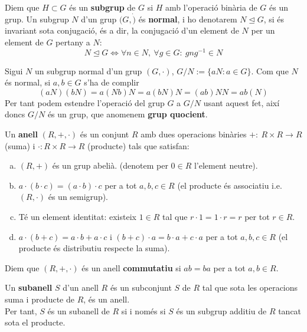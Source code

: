 \begin{definition} Diem que $H\subset G$ és un \textbf{subgrup} de $G$ si $H$ amb l'operació binària de $G$ és un grup. Un subgrup $N$ d'un grup $(G,\dot)$ és \textbf{normal}, i ho denotarem $N\trianglelefteq G$, si és invariant sota conjugació, és a dir, la conjugació d'un element de $N$ per un element de $G$ pertany a $N$:
$$
N\trianglelefteq G \Leftrightarrow \forall n\in N, \ \forall g\in G: \  gng^{-1}\in N
$$
\end{definition}

\begin{definition}\label{defGrupQuocient}
Sigui $N$ un subgrup normal d'un grup $(G,\cdot)$, $G/N:=\{aN: a\in G\}$. Com que $N$ és normal, si $a,b\in G$ s'ha de complir 
$$
(aN)(bN)=a(Nb)N=a(bN)N=(ab)NN=ab(N)
$$
Per tant podem estendre l'operació del grup $G$ a $G/N$ usant aquest fet, així doncs $G/N$ és un grup, que anomenem \textbf{grup quocient}.

\end{definition}

\begin{definition} Un \textbf{anell} $(R,+,\cdot )$ és un conjunt $R$ amb dues operacions binàries $+: \ R\times R \rightarrow R$ (suma) i $\cdot : R\times R \rightarrow R$ (producte) tals que satisfan:

\begin{enumerate}[a)]
\item $(R,+)$ és un grup abelià. (denotem per $0\in R$ l'element neutre).

\item $a\cdot (b \cdot c) = (a \cdot b) \cdot c$ per a tot $a,b,c\in R$ (el producte és associatiu i.e. $(R,\cdot )$ és un semigrup).
\item Té un element identitat: existeix $1\in R$ tal que $r\cdot 1=1\cdot r =r$ per tot $r\in R$.
\item $a \cdot (b+c)=a\cdot b+a \cdot c$ i $(b+c)\cdot a=b\cdot a + c\cdot a$ per a tot $a,b,c\in R$ (el producte és distributiu respecte la suma).
\end{enumerate}
Diem que $(R,+,\cdot )$ és un anell \textbf{commutatiu} si $ab=ba$ per a tot $a,b\in R$.
\end{definition}

\begin{definition}
 Un \textbf{subanell} $S$ d'un anell $R$ és un subconjunt $S$ de $R$ tal que sota les operacions suma i producte de $R$, és un anell. 
\\ \indent Per tant, $S$ és un subanell de $R$ si i només si $S$ és un subgrup additiu de $R$ tancat sota el producte. 
\end{definition}


